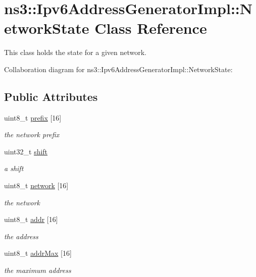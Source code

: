 \hypertarget{classns3_1_1Ipv6AddressGeneratorImpl_1_1NetworkState}{}\section{ns3\+:\+:Ipv6\+Address\+Generator\+Impl\+:\+:Network\+State Class Reference}
\label{classns3_1_1Ipv6AddressGeneratorImpl_1_1NetworkState}


This class holds the state for a given network.  




Collaboration diagram for ns3\+:\+:Ipv6\+Address\+Generator\+Impl\+:\+:Network\+State\+:
\subsection*{Public Attributes}
\begin{DoxyCompactItemize}
\item 
uint8\+\_\+t \hyperlink{classns3_1_1Ipv6AddressGeneratorImpl_1_1NetworkState_adf79c5bbb85a39bf26bf94f5cfd30b0b}{prefix} \mbox{[}16\mbox{]}
\begin{DoxyCompactList}\small\item\em the network prefix \end{DoxyCompactList}\item 
uint32\+\_\+t \hyperlink{classns3_1_1Ipv6AddressGeneratorImpl_1_1NetworkState_a959c55b3a4900a71975f7f5ea3b2d859}{shift}
\begin{DoxyCompactList}\small\item\em a shift \end{DoxyCompactList}\item 
uint8\+\_\+t \hyperlink{classns3_1_1Ipv6AddressGeneratorImpl_1_1NetworkState_ac84710d199384c02e953fd604fe34cee}{network} \mbox{[}16\mbox{]}
\begin{DoxyCompactList}\small\item\em the network \end{DoxyCompactList}\item 
uint8\+\_\+t \hyperlink{classns3_1_1Ipv6AddressGeneratorImpl_1_1NetworkState_ac4a604c7422c65bab24ad2dc003d0316}{addr} \mbox{[}16\mbox{]}
\begin{DoxyCompactList}\small\item\em the address \end{DoxyCompactList}\item 
uint8\+\_\+t \hyperlink{classns3_1_1Ipv6AddressGeneratorImpl_1_1NetworkState_a6dfaa906de6801fc3362fc8ea17e5ad0}{addr\+Max} \mbox{[}16\mbox{]}
\begin{DoxyCompactList}\small\item\em the maximum address \end{DoxyCompactList}\end{DoxyCompactItemize}


